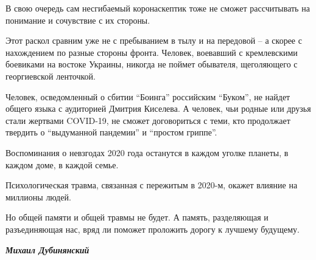 В свою очередь сам несгибаемый коронаскептик тоже не сможет рассчитывать на
понимание и сочувствие с их стороны.

Этот раскол сравним уже не с пребыванием в тылу и на передовой – а скорее с
нахождением по разные стороны фронта. Человек, воевавший с кремлевскими
боевиками на востоке Украины, никогда не поймет обывателя, щеголяющего с
георгиевской ленточкой.

Человек, осведомленный о сбитии \enquote{Боинга} российским \enquote{Буком}, не найдет общего
языка с аудиторией Дмитрия Киселева. А человек, чьи родные или друзья стали
жертвами COVID-19, не сможет договориться с теми, кто продолжает твердить о
\enquote{выдуманной пандемии} и \enquote{простом гриппе}.

Воспоминания о невзгодах 2020 года останутся в каждом уголке планеты, в каждом
доме, в каждой семье.

Психологическая травма, связанная с пережитым в 2020-м, окажет влияние на
миллионы людей.

Но общей памяти и общей травмы не будет. А память, разделяющая и разъединяющая
нас, вряд ли поможет проложить дорогу к лучшему будущему.

\textbf{\em Михаил Дубинянский}

